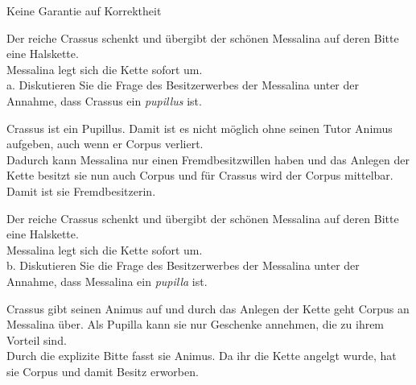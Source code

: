 \documentclass[a4paper]{article}
\newenvironment{shadedquotation}
 {\begin{shaded*}
  \quoting[leftmargin=0pt, vskip=0pt]
 }
 {\endquoting
 \end{shaded*}
}
\begin{document}
Keine Garantie auf Korrektheit \\

\begin{shadedquotation}
Der reiche Crassus schenkt und übergibt der schönen Messalina auf deren Bitte eine Halskette. \\
Messalina legt sich die Kette sofort um. \\

a. Diskutieren Sie die Frage des Besitzerwerbes der Messalina unter der Annahme, dass Crassus ein \textit{pupillus} ist.
\end{shadedquotation}


Crassus ist ein Pupillus. Damit ist es nicht möglich ohne seinen Tutor Animus aufgeben, auch wenn er Corpus verliert. \\

Dadurch kann Messalina nur einen Fremdbesitzwillen haben und das Anlegen der Kette besitzt sie nun auch Corpus und für Crassus wird der Corpus mittelbar. Damit ist sie Fremdbesitzerin.

\begin{shadedquotation}
Der reiche Crassus schenkt und übergibt der schönen Messalina auf deren Bitte eine Halskette. \\
Messalina legt sich die Kette sofort um. \\

b. Diskutieren Sie die Frage des Besitzerwerbes der Messalina unter der Annahme, dass Messalina ein \textit{pupilla} ist.
\end{shadedquotation}

Crassus gibt seinen Animus auf und durch das Anlegen der Kette geht Corpus an Messalina über. Als Pupilla kann sie nur Geschenke annehmen, die zu ihrem Vorteil sind. \\

Durch die explizite Bitte fasst sie Animus. Da ihr die Kette angelgt wurde, hat sie Corpus und damit Besitz erworben.
\end{document}
